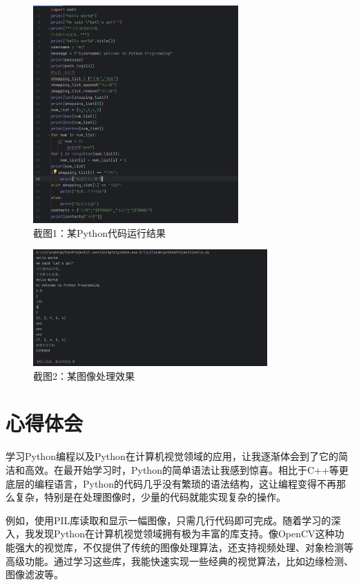 \documentclass{article}
\begin{document}
\begin{figure}[htbp]
\centering
\includegraphics[width=0.7\textwidth]{1.png}
\caption{截图1：某Python代码运行结果}
\label{screenshot1}
\end{figure}

\begin{figure}[htbp]
\centering
\includegraphics[width=0.8\textwidth]{2.png}
\caption{截图2：某图像处理效果}
\label{screenshot2}
\end{figure}

\newpage
\section{心得体会}
学习Python编程以及Python在计算机视觉领域的应用，让我逐渐体会到了它的简洁和高效。在最开始学习时，Python的简单语法让我感到惊喜。相比于C++等更底层的编程语言，Python的代码几乎没有繁琐的语法结构，这让编程变得不再那么复杂，特别是在处理图像时，少量的代码就能实现复杂的操作。

例如，使用PIL库读取和显示一幅图像，只需几行代码即可完成。随着学习的深入，我发现Python在计算机视觉领域拥有极为丰富的库支持。像OpenCV这种功能强大的视觉库，不仅提供了传统的图像处理算法，还支持视频处理、对象检测等高级功能。通过学习这些库，我能快速实现一些经典的视觉算法，比如边缘检测、图像滤波等。
\end{document}
